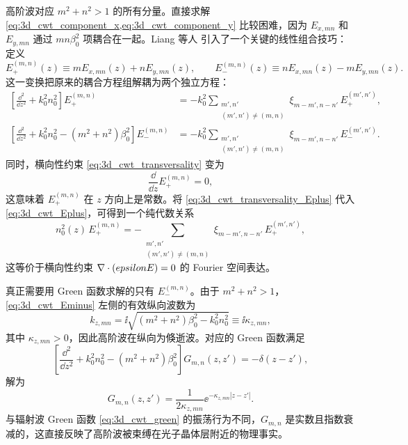 高阶波对应 $m^2+n^2>1$ 的所有分量。直接求解 \cref{eq:3d_cwt_component_x,eq:3d_cwt_component_y} 比较困难，因为 $E_{x,mn}$ 和 $E_{y,mn}$ 通过 $mn\beta_0^2$ 项耦合在一起。Liang 等人 \cite{liang2012square} 引入了一个关键的线性组合技巧：定义
\begin{equation}
E_+^{(m,n)}(z) \equiv m E_{x,mn}(z) + n E_{y,mn}(z),
\qquad
E_-^{(m,n)}(z) \equiv n E_{x,mn}(z) - m E_{y,mn}(z).
\label{eq:3d_cwt_linear_combo}
\end{equation}
这一变换把原来的耦合方程组解耦为两个独立方程：
\begin{align}
\left[\frac{\dd^2}{\dd z^2}+k_0^2 n_0^2\right]E_+^{(m,n)}
&= -k_0^2\!\!\sum_{\substack{m',n'\\(m',n')\neq(m,n)}}\xi_{m-m',n-n'}\,E_+^{(m',n')},
\label{eq:3d_cwt_Eplus}\\
\left[\frac{\dd^2}{\dd z^2}+k_0^2 n_0^2-(m^2+n^2)\beta_0^2\right]E_-^{(m,n)}
&= -k_0^2\!\!\sum_{\substack{m',n'\\(m',n')\neq(m,n)}}\xi_{m-m',n-n'}\,E_-^{(m',n')}.
\label{eq:3d_cwt_Eminus}
\end{align}
同时，横向性约束 \cref{eq:3d_cwt_transversality} 变为
\begin{equation}
\frac{\dd}{\dd z}E_+^{(m,n)} = 0,
\label{eq:3d_cwt_transversality_Eplus}
\end{equation}
这意味着 $E_+^{(m,n)}$ 在 $z$ 方向上是常数。将 \cref{eq:3d_cwt_transversality_Eplus} 代入 \cref{eq:3d_cwt_Eplus}，可得到一个纯代数关系
\begin{equation}
n_0^2(z)\,E_+^{(m,n)} = -\sum_{\substack{m',n'\\(m',n')\neq(m,n)}}\xi_{m-m',n-n'}\,E_+^{(m',n')},
\label{eq:3d_cwt_Eplus_algebraic}
\end{equation}
这等价于横向性约束 $\nabla\cdot(epsilonE)=0$ 的 Fourier 空间表达。

真正需要用 Green 函数求解的只有 $E_-^{(m,n)}$。由于 $m^2+n^2>1$，\cref{eq:3d_cwt_Eminus} 左侧的有效纵向波数为
\begin{equation}
k_{z,mn} = \ii\sqrt{(m^2+n^2)\beta_0^2 - k_0^2 n_0^2} \equiv \ii\kappa_{z,mn},
\label{eq:3d_cwt_kz_ho}
\end{equation}
其中 $\kappa_{z,mn}>0$，因此高阶波在纵向为倏逝波。对应的 Green 函数满足
\begin{equation}
\left[\frac{\dd^2}{\dd z^2}+k_0^2 n_0^2-(m^2+n^2)\beta_0^2\right]G_{m,n}(z,z') = -\delta(z-z'),
\label{eq:3d_cwt_green_ho_def}
\end{equation}
解为
\begin{equation}
G_{m,n}(z,z') = \frac{1}{2\kappa_{z,mn}}\ee^{-\kappa_{z,mn}|z-z'|}.
\label{eq:3d_cwt_green_ho}
\end{equation}
与辐射波 Green 函数 \cref{eq:3d_cwt_green} 的振荡行为不同，$G_{m,n}$ 是实数且指数衰减的，这直接反映了高阶波被束缚在光子晶体层附近的物理事实。

